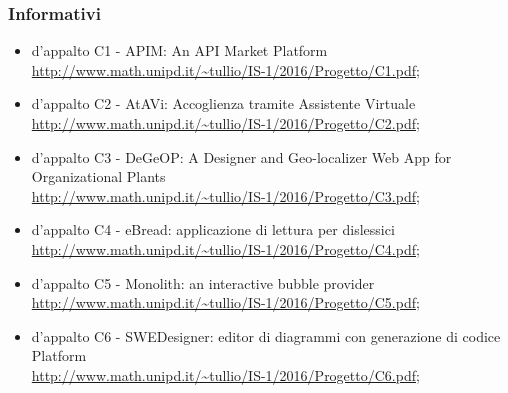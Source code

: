 		\subsubsection {Informativi}
			\begin {itemize}
				\item {} d'appalto C1 - APIM: An API Market Platform \\
					\url {http://www.math.unipd.it/~tullio/IS-1/2016/Progetto/C1.pdf};
				\item {} d'appalto C2 - AtAVi: Accoglienza tramite Assistente Virtuale \\
				\url {http://www.math.unipd.it/~tullio/IS-1/2016/Progetto/C2.pdf};
				\item {} d'appalto C3 - DeGeOP: A Designer and Geo-localizer Web App for Organizational Plants \\
					\url {http://www.math.unipd.it/~tullio/IS-1/2016/Progetto/C3.pdf};
					\item {} d'appalto C4 - eBread: applicazione di lettura per dislessici  \\
					\url {http://www.math.unipd.it/~tullio/IS-1/2016/Progetto/C4.pdf};
					\item {} d'appalto C5 - Monolith: an interactive bubble provider \\
					\url {http://www.math.unipd.it/~tullio/IS-1/2016/Progetto/C5.pdf};
									\item {} d'appalto C6 - SWEDesigner: editor di diagrammi  con generazione di codice Platform \\
					\url {http://www.math.unipd.it/~tullio/IS-1/2016/Progetto/C6.pdf};
					
				
			\end {itemize}
		
		